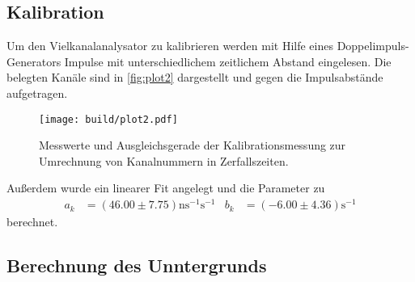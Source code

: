 \subsection{Kalibration}
\label{subsec:Kalibration}
Um den Vielkanalanalysator zu kalibrieren werden mit Hilfe eines Doppelimpuls-Generators Impulse
mit unterschiedlichem zeitlichem Abstand eingelesen. Die belegten Kanäle sind in \autoref{fig:plot2} dargestellt und gegen die Impulsabstände aufgetragen.
\begin{figure}[H]
  \centering
  \texttt{[image: build/plot2.pdf]}
  \caption {Messwerte und Ausgleichsgerade der Kalibrationsmessung zur Umrechnung von Kanalnummern in Zerfallszeiten.}
  \label{fig:plot2}
\end{figure}
Außerdem wurde ein linearer Fit angelegt und die Parameter zu
\begin{align}
  a_k &= (46.00 \pm 7.75) \si{\nano\second^{-1}\second^{-1}} & b_k &= (-6.00 \pm 4.36) \si{\second^{-1}}
\end{align}
berechnet.

\subsection{Berechnung des Unntergrunds}
\label{subsec:Untergrund}

